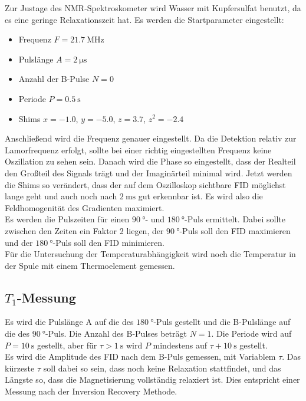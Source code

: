         \noindent Zur Justage des NMR-Spektroskometer wird Wasser mit Kupfersulfat benutzt, da es eine geringe Relaxationszeit hat. Es werden die Startparameter eingestellt: 
        \begin{itemize}
            \item Frequenz $F = \SI{21.7}{\mega\hertz}$
            \item Pulslänge $A = \SI{2}{\micro\second}$
            \item Anzahl der B-Pulse $N = \num{0}$ 
            \item Periode $P = \SI{0.5}{\second}$ 
            \item Shims $x = \num{-1.0}$, $y = \num{-5.0}$, $z = \num{3.7}$, $z^2 = \num{-2.4}$
        \end{itemize}
        Anschließend wird die Frequenz genauer eingestellt. Da die Detektion relativ zur Lamorfrequenz erfolgt, sollte bei einer richtig eingestellten Frequenz keine Oszillation zu sehen sein. 
        Danach wird die Phase so eingestellt, dass der Realteil den Großteil des Signals trägt und der Imaginärteil minimal wird. Jetzt werden die Shims so verändert, dass der auf dem Oszilloskop 
        sichtbare FID möglichst lange geht und auch noch nach $\SI{2}{\milli\second}$ gut erkennbar ist. Es wird also die Feldhomogenität des Gradienten maximiert. \\
        Es werden die Pulszeiten für einen $\SI{90}{\degree}$- und $\SI{180}{\degree}$-Puls ermittelt. Dabei sollte zwischen den Zeiten ein Faktor 2 liegen, der $\SI{90}{\degree}$-Puls soll den 
        FID maximieren und der $\SI{180}{\degree}$-Puls soll den FID minimieren. \\
        Für die Untersuchung der Temperaturabhängigkeit wird noch die Temperatur in der Spule mit einem Thermoelement gemessen. 
        
    \subsection{$T_1$-Messung}

        \noindent Es wird die Pulslänge A auf die des $\SI{180}{\degree}$-Puls gestellt und die B-Pulslänge auf die des $\SI{90}{\degree}$-Puls. Die Anzahl des B-Pulses beträgt $N = 1$. Die Periode 
        wird auf $ P = \SI{10}{\second}$ gestellt, aber für $\tau > \SI{1}{\second}$ wird $P$ mindestens auf $\tau + \SI{10}{\second}$ gestellt.\\ 
        Es wird die Amplitude des FID nach dem B-Puls gemessen, mit Variablem $\tau$. Das kürzeste $\tau$ soll dabei so sein, dass noch keine Relaxation stattfindet, und das Längste so, dass die Magnetisierung 
        vollständig relaxiert ist. Dies entspricht einer Messung nach der Inversion Recovery Methode.

